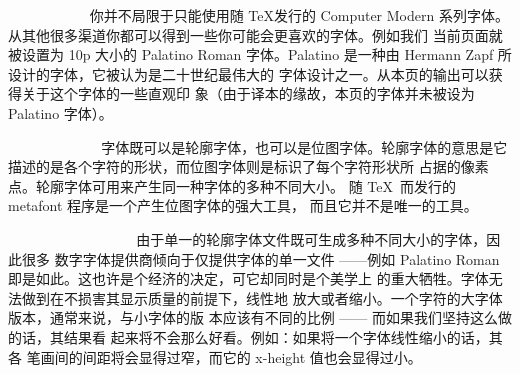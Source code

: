~%
~%
~%
~%
~%
~%
~%
你并不局限于只能使用随 \TeX 发行的 Computer Modern 系列字体。
从其他很多渠道你都可以得到一些你可能会更喜欢的字体。例如我们
当前页面就被设置为 10p 大小的 Palatino Roman 字体。Palatino
是一种由 Hermann Zapf 所设计的字体，它被认为是二十世纪最伟大的
字体设计之一。从本页的输出可以获得关于这个字体的一些直观印
象（由于译本的缘故，本页的字体并未被设为 Palatino 字体）。

~%
~%
~%
~%
~%
~%
~%
~%
字体既可以是轮廓字体，也可以是位图字体。轮廓字体的意思是它
描述的是各个字符的形状，而位图字体则是标识了每个字符形状所
占据的像素点。轮廓字体可用来产生同一种字体的多种不同大小。
随 \TeX\ 而发行的 metafont 程序是一个产生位图字体的强大工具，
而且它并不是唯一的工具。

~%
~%
~%
~%
~%
~%
~%
~%
~%
~%
~%
由于单一的轮廓字体文件既可生成多种不同大小的字体，因此很多
数字字体提供商倾向于仅提供字体的单一文件 ——例如 Palatino
Roman 即是如此。这也许是个经济的决定，可它却同时是个美学上
的重大牺牲。字体无法做到在不损害其显示质量的前提下，线性地
放大或者缩小。一个字符的大字体版本，通常来说，与小字体的版
本应该有不同的比例 —— 而如果我们坚持这么做的话，其结果看
起来将不会那么好看。例如：如果将一个字体线性缩小的话，其各
笔画间的间距将会显得过窄，而它的 x-height 值也会显得过小。

